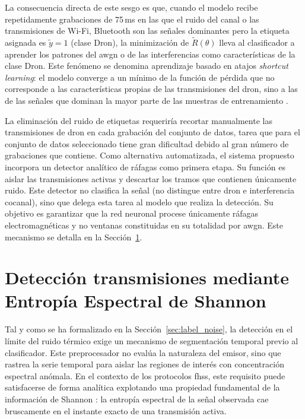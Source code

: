 La consecuencia directa de este sesgo es que, cuando el modelo recibe repetidamente grabaciones de 75\,ms en las que el ruido del canal o las transmisiones de Wi-Fi, Bluetooth son las señales dominantes pero la etiqueta asignada es $\tilde{y} = 1$ (clase Dron), la minimización de $\tilde{R}(\theta)$ lleva al clasificador a aprender los patrones del \gls{awgn} o de las interferencias como características de la clase Dron. Este fenómeno se denomina aprendizaje basado en atajos \textit{shortcut learning}: el modelo converge a un mínimo de la función de pérdida que no corresponde a las características propias de las transmisiones del dron, sino a las de las señales que dominan la mayor parte de las muestras de entrenamiento \cite{geirhos_shortcut_2020}.

La eliminación del ruido de etiquetas requeriría recortar manualmente las transmisiones de dron en cada grabación del conjunto de datos, tarea que para el conjunto de datos seleccionado tiene gran dificultad debido al gran número de grabaciones que contiene. Como alternativa automatizada, el sistema propuesto incorpora un detector analítico de ráfagas como primera etapa. Su función es aislar las transmisiones activas y descartar los tramos que contienen únicamente ruido. Este detector no clasifica la señal (no distingue entre dron e interferencia cocanal), sino que delega esta tarea al modelo que realiza la detección. Su objetivo es garantizar que la red neuronal procese únicamente ráfagas electromagnéticas y no ventanas constituidas en su totalidad por \gls{awgn}. Este mecanismo se detalla en la Sección~\ref{sec:detector_entropia}.

\section{Detección transmisiones mediante Entropía Espectral de Shannon}
\label{sec:detector_entropia}

Tal y como se ha formalizado en la Sección~\ref{sec:label_noise}, la detección en el límite del ruido térmico exige un mecanismo de segmentación temporal previo al clasificador. Este preprocesador no evalúa la naturaleza del emisor, sino que rastrea la serie temporal para aislar las regiones de interés con concentración espectral anómala. En el contexto de los protocolos \gls{fhss}, este requisito puede satisfacerse de forma analítica explotando una propiedad fundamental de la información de Shannon \cite{zhang_entropy-based_1989}: la entropía espectral de la señal observada cae bruscamente en el instante exacto de una transmisión activa.

